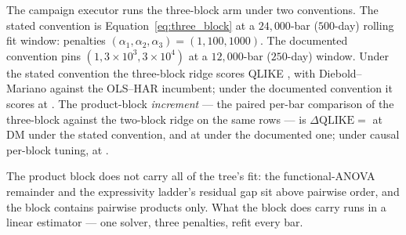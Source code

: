 The campaign executor runs the three-block arm under two conventions. The
stated convention is Equation~\eqref{eq:three_block} at a $24{,}000$-bar
($500$-day) rolling fit window: penalties
$(\alpha_1, \alpha_2, \alpha_3) = (1, 100, 1000)$. The documented
convention pins $(1, 3\times10^{3}, 3\times10^{4})$ at a $12{,}000$-bar
($250$-day) window. Under the stated convention the three-block ridge
scores QLIKE \unifBlkThreeUserQLIKE{}, with Diebold--Mariano
\unifBlkThreeUserDM{} against the OLS--HAR incumbent; under the
documented convention it scores \unifBlkThreeDocQLIKE{} at
\unifBlkThreeDocDM{}. The product-block \emph{increment} --- the paired
per-bar comparison of the three-block against the two-block ridge on the
same rows --- is $\Delta\mathrm{QLIKE} = $ \unifIncrBlkThreeUserDQ{} at
DM \unifIncrBlkThreeUserDM{} under the stated convention, and
\unifIncrBlkThreeDocDQ{} at \unifIncrBlkThreeDocDM{} under the documented
one; under causal per-block tuning, \unifIncrBlkThreeTunedDQ{} at
\unifIncrBlkThreeTunedDM{}.

The product block does not carry all of the tree's fit: the
functional-ANOVA remainder and the expressivity ladder's residual gap sit
above pairwise order, and the block contains pairwise products only. What
the block does carry runs in a linear estimator --- one solver, three
penalties, refit every bar.
